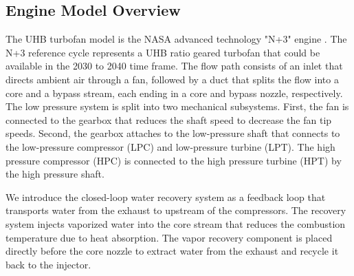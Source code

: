 \documentclass[conf]{new-aiaa}
\begin{document}
\subsection{Engine Model Overview}
The UHB turbofan model is the NASA advanced technology "N+3" engine \cite{Jones2017a}.
The N+3 reference cycle represents a UHB ratio geared turbofan that could be available in the 2030 to 2040 time frame.
The flow path consists of an inlet that directs ambient air through a fan, followed by a duct that splits the flow into a core and a bypass stream, each ending in a core and bypass nozzle, respectively.
The low pressure system is split into two mechanical subsystems.
First, the fan is connected to the gearbox that reduces the shaft speed to decrease the fan tip speeds.
Second, the gearbox attaches to the low-pressure shaft that connects to the low-pressure compressor (LPC) and low-pressure turbine (LPT).
The high pressure compressor (HPC) is connected to the high pressure turbine (HPT) by the high pressure shaft.

We introduce the closed-loop water recovery system as a feedback loop that transports water from the exhaust to upstream of the compressors.
The recovery system injects vaporized water into the core stream that reduces the combustion temperature due to heat absorption.
The vapor recovery component is placed directly before the core nozzle to extract water from the exhaust and recycle it back to the injector.
\end{document}
